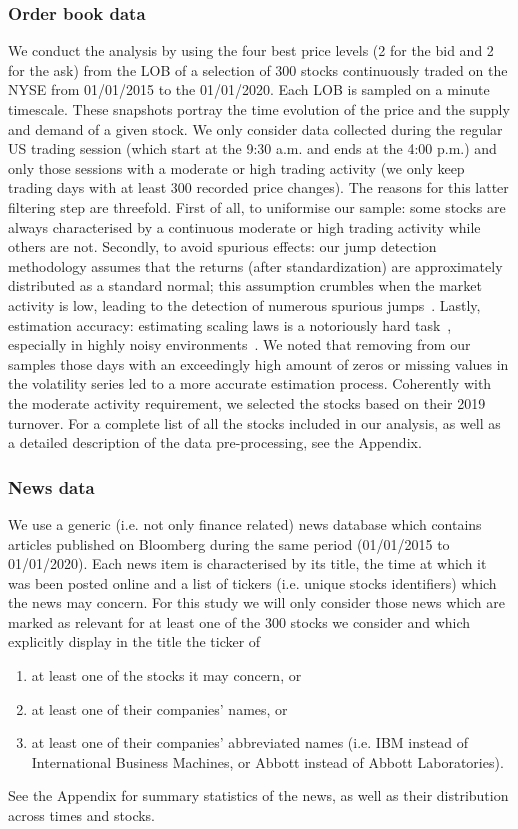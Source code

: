 \documentclass[amsmath,amssymb,aps,pre,floatfix,twocolumn,superscriptaddress]{revtex4}
\begin{document}
\subsubsection{Order book data} 

We conduct the analysis by using the four best price levels (2 for the bid and 2 for the ask) from the LOB of a selection of 300 stocks continuously traded on the NYSE from 01/01/2015 to the 01/01/2020. Each LOB is sampled on a minute timescale. These snapshots portray the time evolution of the price and the supply and demand of a given stock. We only consider data collected during the regular US trading session (which start at the 9:30 a.m. and ends at the 4:00 p.m.) and only those sessions with a moderate or high trading activity (we only keep trading days with at least 300 recorded price changes). The reasons for this latter filtering step are threefold. First of all, to uniformise our sample: some stocks are always characterised by a continuous moderate or high trading activity while others are not. Secondly, to avoid spurious effects: our jump detection methodology assumes that the returns (after standardization) are approximately distributed as a standard normal; this assumption crumbles when the market activity is low, leading to the detection of numerous spurious jumps~\cite{lillo_cojump}. Lastly, estimation accuracy: estimating scaling laws is a notoriously hard task~\cite{sornette_youtube}, especially in highly noisy environments~\cite{horbelt_scaling}. We noted that removing from our samples those days with an exceedingly high amount of zeros or missing values in the volatility series led to a more accurate estimation process. Coherently with the moderate activity requirement, we selected the stocks based on their 2019 turnover. For a complete list of all the stocks included in our analysis, as well as a detailed description of the data pre-processing, see the Appendix.

\subsubsection{News data} 

We use a generic (i.e. not only finance related) news database which contains articles published on Bloomberg during the same period (01/01/2015 to 01/01/2020). Each news item is characterised by its title, the time at which it was been posted online and a list of tickers (i.e. unique stocks identifiers) which the news may concern. For this study we will only consider those news which are marked as relevant for at least one of the 300 stocks we consider and which explicitly display in the title the ticker of 
\begin{enumerate}
    \item at least one of the stocks it may concern, or
    \item at least one of their companies' names, or
    \item at least one of their companies' abbreviated names (i.e. IBM instead of International Business Machines, or Abbott instead of Abbott Laboratories).
\end{enumerate} 
See the Appendix for summary statistics of the news, as well as their distribution across times and stocks.
\end{document}
